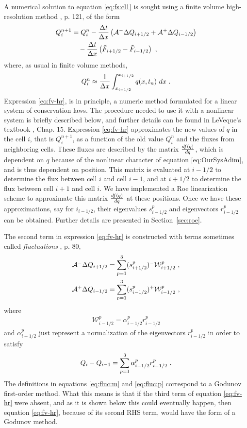 A numerical solution to equation \eqref{eq:fs:cl1} is sought using a finite volume high-resolution method \citep{leveque-book-fv}, p. 121, of the form
\begin{align}
  \nonumber
  Q_i^{n+1} &= Q_i^n
  -\frac{\Delta t}{\Delta x}
  \left(
    \mathcal{A}^-\Delta Q_{i+1/2}
    + \mathcal{A}^+\Delta Q_{i-1/2}
  \right) \\
  \label{eq:fv-hr}
  & \quad
  -\frac{\Delta t}{\Delta x}
  \left(
    \tilde{F}_{i+1/2}
    -\tilde{F}_{i-1/2}
  \right)
  \ \text{,}
\end{align}
where, as usual in finite volume methods,
\begin{align*}
  Q^n_i \approx \frac{1}{\Delta x} \int_{x_{i-1/2}}^{x_{i+1/2}} 
  q(x,t_n) \ dx
  \ \text{.}
\end{align*}
Expression \eqref{eq:fv-hr}, is in principle, a numeric method formulated for a linear system of conservation laws. The procedure needed to use it with a nonlinear system is briefly described below, and further details can be found in LeVeque's textbook \citep{leveque-book-fv}, Chap. 15. 
Expression \eqref{eq:fv-hr} approximates the new values of $q$ in the cell $i$, that is $Q^{n+1}_i$, as a function of the old value $Q^n_i$ and the fluxes from neighboring cells. 
These fluxes are described by the matrix $\frac{d f(q)}{d q}$, which is dependent on $q$ because of the nonlinear character of equation \eqref{eq:OurSysAdim}, and is thus dependent on position.
This matrix is evaluated at $i-1/2$ to determine the flux between cell $i$ and cell $i-1$, and at $i+1/2$ to determine the flux between cell $i+1$ and cell $i$. 
We have implemented a Roe linearization \citep{roe, leveque-book-fv} scheme to approximate this matrix $\frac{d f(q)}{d q}$ at these positions. 
Once we have these approximations, say for $i_{i-1/2}$, their eigenvalues $s_{i-1/2}^p$ and eigenvectors $r_{i-1/2}^p$ can be obtained. Further details are presented in Section~\ref{sec:roe}. 

The second term in expression \eqref{eq:fv-hr} is constructed with terms sometimes called {\em fluctuations} \citep{leveque-book-fv}, p. 80,
\begin{align}
  \label{eq:fluc:m}
  \mathcal{A}^-\Delta Q_{i+1/2} 
  &= \sum_{p=1}^3(s_{i+1/2}^p)^- \mathcal{W}_{i+1/2}^p 
  \ \text{,}\\
  \label{eq:fluc:p}
  \mathcal{A}^+\Delta Q_{i-1/2} 
  &= \sum_{p=1}^3(s_{i-1/2}^p)^+ \mathcal{W}_{i-1/2}^p
  \ \text{,}
\end{align}
where 
\begin{align*}
  \mathcal{W}^p_{i-1/2} = \alpha^p_{i-1/2} r^p_{i-1/2}
\end{align*}
and $\alpha^p_{i-1/2}$ just represent a normalization of the eigenvectors $r^p_{i-1/2}$ in order to satisfy
\begin{align*}
  Q_i - Q_{i-1} = \sum_{p=1}^3 \alpha_{i-1/2}^p r^p_{i-1/2}
  \ \text{.}
\end{align*}
The definitions in equations \eqref{eq:fluc:m} and \eqref{eq:fluc:p} correspond to a Godunov first-order method. What this means is that if the third term of equation \eqref{eq:fv-hr} were absent, and as it is shown below this could eventually happen, then equation \eqref{eq:fv-hr}, because of its second RHS term, would have the form of a Godunov method.

